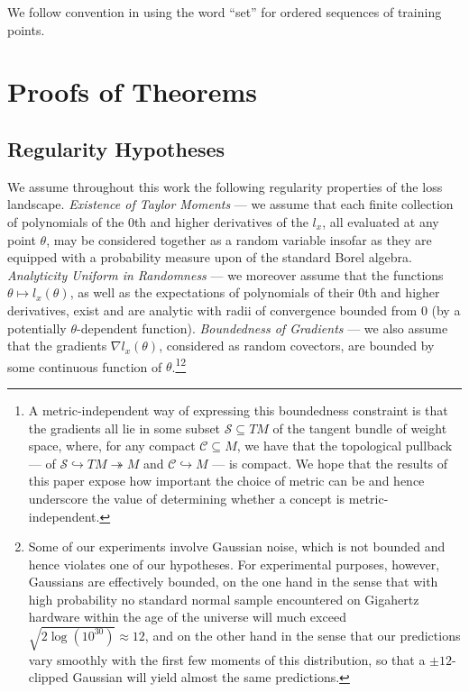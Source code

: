 \documentclass{article}
\theoremstyle{plain}
\theoremstyle{definition}
\newcommand{\Cc}{\mathcal{C}}   \newcommand{\CC}{\mathbb{C}}
\newcommand{\Ss}{\mathcal{S}}
\begin{document}
        We follow convention in using the word ``set'' for ordered sequences of
        training points. 

\section{Proofs of Theorems} \label{sect:proofs}
   
    \subsection{Regularity Hypotheses}
        We assume throughout this work the following regularity properties of
        the loss landscape.  \emph{Existence of Taylor Moments} --- we assume
        that each finite collection of polynomials of the $0$th and higher
        derivatives of the $l_x$, all evaluated at any point $\theta$, may be
        considered together as a random variable insofar as they are equipped
        with a probability measure upon of the standard Borel algebra.
        \emph{Analyticity Uniform in Randomness} --- we moreover assume that
        the functions $\theta \mapsto l_x(\theta)$, as well as the expectations
        of polynomials of their $0$th and higher derivatives, exist and are
        analytic with radii of convergence bounded from $0$ (by a potentially
        $\theta$-dependent function).
        \emph{Boundedness of Gradients} --- we also assume that the gradients
        $\nabla l_x(\theta)$, considered as random covectors, are bounded by
        some continuous function of $\theta$.\footnote{
            A metric-independent way of expressing this boundedness constraint
            is that the gradients all lie in some subset $\Ss \subseteq TM$ of
            the tangent bundle of weight space, where, for any compact $\Cc
            \subseteq M$, we have that the topological pullback --- of
            $\Ss \hookrightarrow TM \twoheadrightarrow M$
            and
            $\Cc \hookrightarrow M$ ---
            is compact.  We hope that the results of this paper expose how
            important the choice of metric can be and hence underscore the
            value of determining  whether a concept is metric-independent.
        }\footnote{
            Some of our experiments involve Gaussian noise, which is not
            bounded and hence violates one of our hypotheses.  For experimental
            purposes, however, Gaussians are effectively bounded, on the one
            hand in the sense that with high probability no standard normal
            sample encountered on Gigahertz hardware within the age of the
            universe will much exceed $\sqrt{2 \log(10^{30})} \approx 12$, and
            on the other hand in the sense that our predictions vary smoothly
            with the first few moments of this distribution, so that a $\pm
            12$-clipped Gaussian will yield almost the same predictions.
        }
\end{document}
